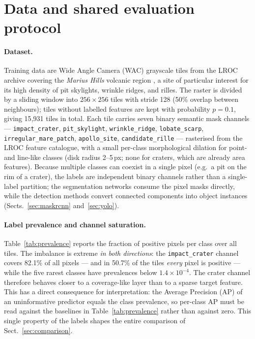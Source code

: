 \section{Data and shared evaluation protocol}
\label{sec:mr_dataset}

\paragraph{Dataset.}
Training data are Wide Angle Camera (WAC) grayscale tiles from the LROC archive covering the \textit{Marius Hills} volcanic region \citep{mariusdata}, a site of particular interest for its high density of pit skylights, wrinkle ridges, and rilles. The raster is divided by a sliding window into $256\times256$ tiles with stride 128 (50\% overlap between neighbours); tiles without labelled features are kept with probability $p=0.1$, giving 15{,}931 tiles in total. Each tile carries seven binary semantic mask channels --- \texttt{impact\_crater}, \texttt{pit\_skylight}, \texttt{wrinkle\_ridge}, \texttt{lobate\_scarp}, \texttt{irregular\_mare\_patch}, \texttt{apollo\_site}, \texttt{candidate\_rille} --- rasterised from the LROC feature catalogue, with a small per-class morphological dilation for point- and line-like classes (disk radius 2--5\,px; none for craters, which are already area features). Because multiple classes can coexist in a single pixel (e.g.\ a pit on the rim of a crater), the labels are independent binary channels rather than a single-label partition; the segmentation networks consume the pixel masks directly, while the detection methods convert connected components into object instances (Sects.~\ref{sec:maskrcnn} and~\ref{sec:yolo}).

\paragraph{Label prevalence and channel saturation.}
Table~\ref{tab:prevalence} reports the fraction of positive pixels per class over all tiles. The imbalance is extreme \emph{in both directions}: the \texttt{impact\_crater} channel covers 82.1\% of all pixels --- and in 50.7\% of the tiles \emph{every} pixel is positive --- while the five rarest classes have prevalences below $1.4\times10^{-4}$. The crater channel therefore behaves closer to a coverage-like layer than to a sparse target feature. This has a direct consequence for interpretation: the Average Precision (AP) of an uninformative predictor equals the class prevalence, so per-class AP must be read against the baselines in Table~\ref{tab:prevalence} rather than against zero. This single property of the labels shapes the entire comparison of Sect.~\ref{sec:comparison}.

